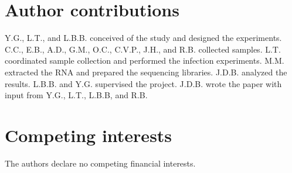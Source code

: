 \documentclass[fleqn,10pt]{wlscirep}
\begin{document}
\section*{Author contributions}

Y.G., L.T., and L.B.B. conceived of the study and designed the
experiments. C.C., E.B., A.D., G.M., O.C., C.V.P., J.H., and R.B.
collected samples. L.T. coordinated sample collection and performed
the infection experiments. M.M. extracted the RNA and prepared the
sequencing libraries. J.D.B. analyzed the results. L.B.B. and Y.G.
supervised the project. J.D.B. wrote the paper with input from Y.G.,
L.T., L.B.B, and R.B.
\section*{Competing interests}

The authors declare no competing financial interests.




\clearpage
\newpage
\end{document}
